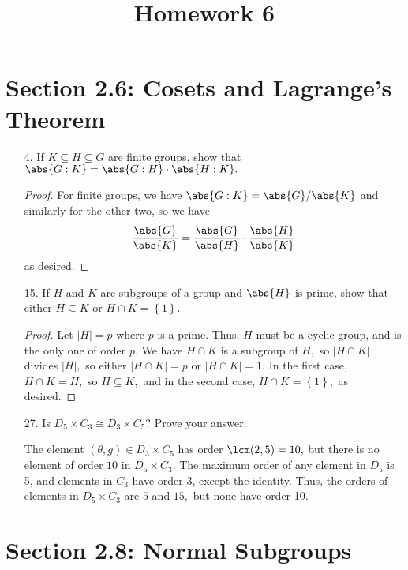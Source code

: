 \documentclass{article}
\begin{document}
\title{Homework 6}
\maketitle
\thispagestyle{fancy}

\section*{Section 2.6: Cosets and Lagrange's Theorem}

\begin{itemize}
	\item[4.] If $K\subseteq H\subseteq G$ are finite groups, show that $\abs{G:K}=\abs{G:H}\cdot\abs{H:K}.$
		\begin{proof}
			For finite groups, we have $\abs{G:K}=\abs{G}/\abs{K}$ and similarly for the other two, so we have \[\frac{\abs{G}}{\abs{K}}=\frac{\abs{G}}{\abs{H}}\cdot\frac{\abs{H}}{\abs{K}}\] as desired.
			
		\end{proof}

	\item[15.] If $H$ and $K$ are subgroups of a group and $\abs{H}$ is prime, show that either $H\subseteq K$ or $H\cap K=\left\{ 1 \right\}.$
		\begin{proof}
			Let $|H|=p$ where $p$ is a prime. Thus, $H$ must be a cyclic group, and is the only one of order $p.$ We have $H\cap K$ is a subgroup of $H,$ so $|H\cap K|$ divides $|H|,$ so either $|H\cap K|=p$ or $|H\cap K|=1.$ In the first case, $H\cap K=H,$ so $H\subseteq K,$ and in the second case, $H\cap K=\left\{ 1 \right\},$ as desired.
			
		\end{proof}

	\item[27.] Is $D_5\times C_3\cong D_3\times C_5?$ Prove your answer.
		\begin{soln}
			The element $(\theta, g)\in D_3\times C_5$ has order $\lcm(2, 5) = 10,$ but there is no element of order $10$ in $D_5\times C_3.$ The maximum order of any element in $D_5$ is 5, and elements in $C_3$ have order 3, except the identity. Thus, the orders of elements in $D_5\times C_3$ are $5$ and $15,$ but none have order 10.
			
		\end{soln}
		
\end{itemize}

\section*{Section 2.8: Normal Subgroups}
\end{document}
